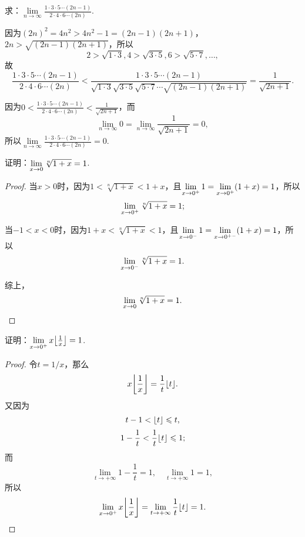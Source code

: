 \begin{example}
求：\(\lim\limits_{n\to\infty}\frac{1 \cdot 3 \cdot 5 \dotsm (2n-1)}{2 \cdot 4 \cdot 6 \dotsm (2n)}\).
\begin{solution}
因为\((2n)^2 = 4n^2 > 4n^2-1 = (2n-1)(2n+1)\)，\(2n > \sqrt{(2n-1)(2n+1)}\)，所以\[
2 > \sqrt{1 \cdot 3},
4 > \sqrt{3 \cdot 5},
6 > \sqrt{5 \cdot 7},
\dotsc,
\]故\[
\frac{1 \cdot 3 \cdot 5 \dotsm (2n-1)}{2 \cdot 4 \cdot 6 \dotsm (2n)}
< \frac{1 \cdot 3 \cdot 5 \dotsm (2n-1)}{\sqrt{1 \cdot 3} \sqrt{3 \cdot 5} \sqrt{5 \cdot 7} \dotsm \sqrt{(2n-1)(2n+1)}}
= \frac{1}{\sqrt{2n+1}}.
\]

因为\(0 < \frac{1 \cdot 3 \cdot 5 \dotsm (2n-1)}{2 \cdot 4 \cdot 6 \dotsm (2n)} < \frac{1}{\sqrt{2n+1}}\)，而\[
\lim\limits_{n\to\infty}0 = \lim\limits_{n\to\infty}\frac{1}{\sqrt{2n+1}} = 0,
\]所以\(\lim\limits_{n\to\infty}\frac{1 \cdot 3 \cdot 5 \dotsm (2n-1)}{2 \cdot 4 \cdot 6 \dotsm (2n)} = 0\).
\end{solution}
\end{example}

\begin{example}
\renewcommand\l[1][]{\lim\limits_{x\to0\ifx\relax#1\relax\else^{#1}\fi}}
证明：\(\l \sqrt[n]{1+x} = 1\).
\begin{proof}
当\(x > 0\)时，因为\(1 < \sqrt[n]{1+x} < 1+x\)，且\(\l[+] 1 = \l[+](1+x) = 1\)，所以\[
\l[+] \sqrt[n]{1+x} = 1;
\]

当\(-1 < x < 0\)时，因为\(1+x < \sqrt[n]{1+x} < 1\)，且\(\l[-] 1 = \l[+-](1+x) = 1\)，所以\[
\l[-] \sqrt[n]{1+x} = 1.
\]

综上，\[
\l \sqrt[n]{1+x} = 1.
\qedhere
\]
\end{proof}
\end{example}

\begin{example}
证明：\(\lim\limits_{x\to0^+} x \floor*{\frac{1}{x}} = 1\).
\begin{proof}
令\(t=1/x\)，那么\[
x \floor*{\frac{1}{x}} = \frac{1}{t} \floor{t}.
\]又因为\[
t - 1 < \lfloor t\rfloor \leqslant t,
\]\[
1 - \frac{1}{t} < \frac{1}{t} \lfloor t\rfloor \leqslant 1;
\]而\[
\lim\limits_{t\to+\infty} 1 - \frac{1}{t} = 1,
\quad
\lim\limits_{t\to+\infty} 1 = 1,
\]所以\[
\lim\limits_{x\to0^+} x \floor*{\frac{1}{x}} = \lim\limits_{t\to+\infty} \frac{1}{t} \floor{t} = 1.
\qedhere
\]
\end{proof}
\end{example}

